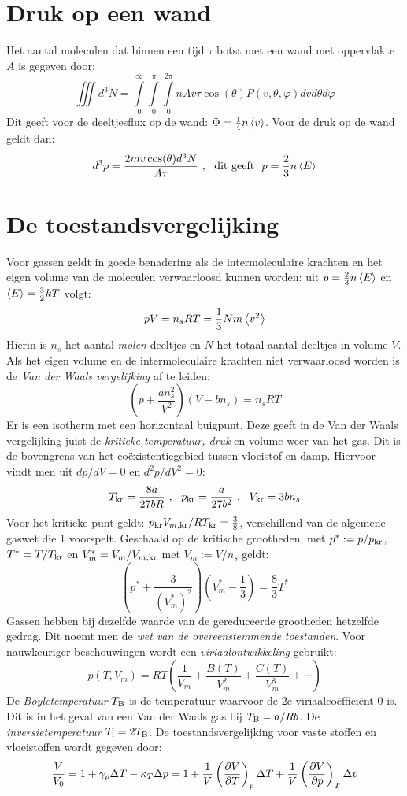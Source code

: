 \section{Druk op een wand}
Het aantal moleculen dat binnen een tijd $\tau$ botst met een wand met
oppervlakte $A$ is gegeven door:
\[
\iiint d^3N=\int\limits_0^\infty \int\limits_0^\pi \int\limits_0^{2\pi}
nAv\tau\cos(\theta)P(v,\theta,\varphi)dvd\theta d\varphi
\]
Dit geeft voor de deeltjesflux op de wand: $\Phi=\mbox{$\frac{1}{4}$} n\left\langle v \right\rangle$. Voor de
druk op de wand geldt dan:
\[
d^3p=\frac{2mv\cos(\theta)d^3N}{A\tau}~,~~\mbox{dit geeft}~~p=\frac{2}{3}n\left\langle E \right\rangle
\]

\section{De toestandsvergelijking}
Voor gassen geldt in goede benadering als de intermoleculaire krachten en het
eigen volume van de moleculen verwaarloosd kunnen worden: uit
$p=\frac{2}{3}n\left\langle E \right\rangle$ en $\left\langle E \right\rangle=\frac{3}{2}kT$ volgt:
\[
pV=n_sRT=\frac{1}{3}Nm\left\langle v^2 \right\rangle
\]
Hierin is $n_s$ het aantal {\it molen} deeltjes en $N$ het totaal aantal
deeltjes in volume $V$. Als het eigen volume en de intermoleculaire
krachten niet verwaarloosd worden is de {\it Van der Waals vergelijking} af
te leiden:
\[
\left(p+\frac{an_s^2}{V^2}\right)(V-bn_s)=n_sRT
\]
Er is een isotherm met een horizontaal buigpunt. Deze geeft in de Van der
Waals vergelijking juist de {\it kritieke temperatuur, druk} en {volume} weer
van het gas. Dit is de bovengrens van het co\"existentiegebied tussen
vloeistof en damp. Hiervoor vindt men uit $dp/dV=0$ en $d^2p/dV^2=0$:
\[
T_{\rm kr}=\frac{8a}{27bR}~,~~p_{\rm kr}=\frac{a}{27b^2}~,~~V_{\rm kr}=3bn_s
\]
Voor het kritieke punt geldt: $p_{\rm kr}V_{m,\rm kr}/RT_{\rm kr}=\frac{3}{8}$,
verschillend van de algemene gaswet die 1 voorspelt.
\npar
Geschaald op de kritische grootheden, met $p^*:=p/p_{\rm kr}$,
$T^*=T/T_{\rm kr}$ en $V_m^*=V_m/V_{m,\rm kr}$ met $V_m:=V/n_s$ geldt:
\[
\left(p^*+\frac{3}{(V_m^*)^2}\right)\left(V_m^*-\mbox{$\frac{1}{3}$}\right)=
\mbox{$\frac{8}{3}$}T^*
\]
Gassen hebben bij dezelfde waarde van de gereduceerde grootheden hetzelfde
gedrag. Dit noemt men de {\it wet van de overeenstemmende toestanden}. Voor
nauwkeuriger beschouwingen wordt een {\it viriaalontwikkeling} gebruikt:
\[
p(T,V_m)=RT\left(\frac{1}{V_m}+\frac{B(T)}{V_m^2}+\frac{C(T)}{V_m^3}+\cdots\right)
\]
De {\it Boyletemperatuur} $T_{\rm B}$ is de temperatuur waarvoor de 2e
viriaalco\"effici\"ent 0 is. Dit is in het geval van een Van der Waals gas
bij $T_{\rm B}=a/Rb$. De {\it inversietemperatuur} $T_{\rm i}=2T_{\rm B}$.
\npar
De toestandsvergelijking voor vaste stoffen en vloeistoffen wordt gegeven door:
\[
\frac{V}{V_0}=1+\gamma_p\Delta T-\kappa_T\Delta p=
1+\frac{1}{V}\left(\frac{\partial V}{\partial T}\right)_{p}\Delta T+\frac{1}{V}\left(\frac{\partial V}{\partial p}\right)_{T}\Delta p
\]

